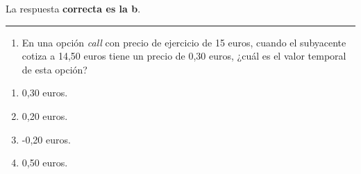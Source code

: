 \documentclass[
  letterpaper,
  DIV=11,
  numbers=noendperiod]{scrreprt}
\providecommand{\tightlist}{%
  \setlength{\itemsep}{0pt}\setlength{\parskip}{0pt}}\usepackage{longtable,booktabs,array}
\begin{document}
\begin{tcolorbox}[enhanced jigsaw, left=2mm, opacityback=0, colback=white, breakable, arc=.35mm, bottomrule=.15mm, rightrule=.15mm, toprule=.15mm, leftrule=.75mm, colframe=quarto-callout-tip-color-frame]
\begin{minipage}[t]{5.5mm}
\textcolor{quarto-callout-tip-color}{\faLightbulb}
\end{minipage}%
\begin{minipage}[t]{\textwidth - 5.5mm}

La respuesta \textbf{correcta es la b}.

\end{minipage}%
\end{tcolorbox}

\begin{center}\rule{0.5\linewidth}{0.5pt}\end{center}

\begin{enumerate}
\def\labelenumi{\arabic{enumi}.}
\setcounter{enumi}{21}
\tightlist
\item
  En una opción \emph{call} con precio de ejercicio de 15 euros, cuando
  el subyacente cotiza a 14,50 euros tiene un precio de 0,30 euros,
  ¿cuál es el valor temporal de esta opción?
\end{enumerate}

\begin{enumerate}
\def\labelenumi{\alph{enumi}.}
\item
  0,30 euros.
\item
  0,20 euros.
\item
  -0,20 euros.
\item
  0,50 euros.
\end{enumerate}
\end{document}
